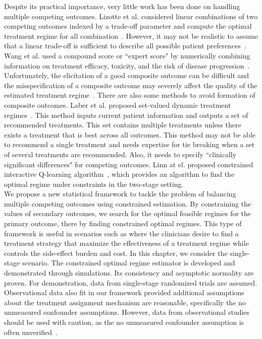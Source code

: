  Despite its practical importance, very little work has been done on handling multiple competing outcomes. Lizotte et al. considered linear combinations of two competing outcomes indexed by a trade-off parameter and compute the optimal treatment regime for all combination~\cite{Lizotte2010}. However, it may not be realistic to assume that a linear trade-off is sufficient to describe all possible patient preferences~\cite{LaberTwo2014}. Wang et al. used a compound score or ``expert score" by numerically combining information on treatment efficacy, toxicity, and the risk of disease progression~\cite{Wang2012}. Unfortunately, the elicitation of a good composite outcome can be difficult and the misspecification of a composite outcome may severely affect the quality of the estimated treatment regime~\cite{Laber2014}. There are also some methods to avoid formation of composite outcomes. Laber et al. proposed set-valued dynamic treatment regimes~\cite{LaberTwo2014}. This method inputs current patient information and outputs a set of recommended treatments. This set contains multiple treatments unless there exists a treatment that is best across all outcomes. This method may not be able to recommend a single treatment and needs expertise for tie breaking when a set of several treatments are recommended. Also, it needs to specify ``clinically significant differences" for competing outcomes. Linn at el. proposed constrained interactive Q-learning algorithm~\cite{Linn2014a}, which provides an algorithm to find the optimal regime under constraints in the two-stage setting.\\

We propose a new statistical framework to tackle the problem of balancing multiple competing outcomes using constrained estimation. By constraining the values of secondary outcomes, we search for the optimal feasible regimes for the primary outcome, there by finding constrained optimal regimes. This type of framework is useful in scenarios such as where the clinicians desire to find a treatment strategy that maximize the effectiveness of a treatment regime while controls the side-effect burden and cost. In this chapter, we consider the single-stage scenario. The constrained optimal regime estimator is developed and demonstrated through simulations. Its consistency and asymptotic normality are proven. For demonstration, data from single-stage randomized trials are assumed. Observational data also fit in our framework provided additional assumptions about the treatment assignment mechanism are reasonable, specifically the no unmeasured confounder assumptions. However, data from observational studies should be used with caution, as the no unmeasured confounder assumption is often unverified~\cite{Chakraborty2013}.

